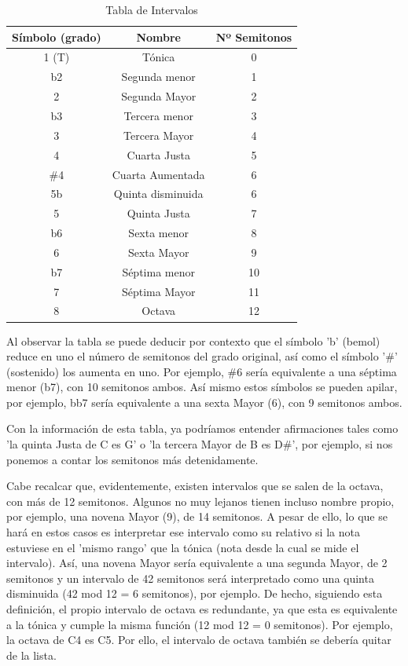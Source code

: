 \begin{table}[h]
    \centering
    \begin{tabular}{c|c|c}
        \textbf{Símbolo (grado)} & \textbf{Nombre} & \textbf{Nº Semitonos} \\
        \hline
        1 (T) & Tónica & 0 \\
        b2 & Segunda menor & 1 \\
        2 & Segunda Mayor & 2 \\
        b3 & Tercera menor & 3 \\
        3 & Tercera Mayor & 4 \\
        4 & Cuarta Justa & 5 \\
        \#4 & Cuarta Aumentada & 6 \\
        5b & Quinta disminuida & 6 \\
        5 & Quinta Justa & 7 \\
        b6 & Sexta menor & 8 \\
        6 & Sexta Mayor & 9 \\
        b7 & Séptima menor & 10 \\
        7 & Séptima Mayor & 11 \\
        8 & Octava & 12 \\
    \end{tabular}
    \caption{Tabla de Intervalos}
    \label{tab:tabla_intervalos}
\end{table}

    Al observar la tabla se puede deducir por contexto que el símbolo 'b' (bemol) reduce en uno el número de semitonos del grado original, así como el símbolo '\#' (sostenido) los aumenta en uno. Por ejemplo, \#6 sería equivalente a una séptima menor (b7), con 10 semitonos ambos. Así mismo estos símbolos se pueden apilar, por ejemplo, bb7 sería equivalente a una sexta Mayor (6), con 9 semitonos ambos.

    Con la información de esta tabla, ya podríamos entender afirmaciones tales como 'la quinta Justa de C es G' o 'la tercera Mayor de B es D\#', por ejemplo, si nos ponemos a contar los semitonos más detenidamente.

    Cabe recalcar que, evidentemente, existen intervalos que se salen de la octava, con más de 12 semitonos. Algunos no muy lejanos tienen incluso nombre propio, por ejemplo, una novena Mayor (9), de 14 semitonos. A pesar de ello, lo que se hará en estos casos es interpretar ese intervalo como su relativo si la nota estuviese en el 'mismo rango' que la tónica (nota desde la cual se mide el intervalo). Así, una novena Mayor sería equivalente a una segunda Mayor, de 2 semitonos y un intervalo de 42 semitonos será interpretado como una quinta disminuida (42 mod 12 = 6 semitonos), por ejemplo. De hecho, siguiendo esta definición, el propio intervalo de octava es redundante, ya que esta es equivalente a la tónica y cumple la misma función (12 mod 12 = 0 semitonos). Por ejemplo, la octava de C4 es C5. Por ello, el intervalo de octava también se debería quitar de la lista.

